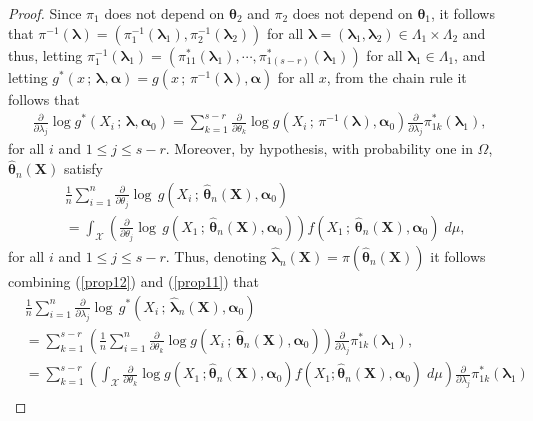\documentclass[10pt,a4paper,onecolumn]{article} %
\newcommand{\bs}{\boldsymbol}
\begin{document}
\begin{proof}Since $\pi_1$ does not depend on $\bs{\theta}_2$ and $\pi_2$ does not depend on $\bs{\theta}_1$, it follows that $\pi^{-1}(\bs{\lambda})=\left(\pi_1^{-1}(\bs{\lambda}_1),\pi_2^{-1}(\bs{\lambda}_2)\right)$ for all $\bs{\lambda}=(\bs{\lambda}_1,\bs{\lambda}_2)\in \Lambda_1\times \Lambda_2$ and thus, letting $\pi_1^{-1}(\bs{\lambda}_1)=\left(\pi^*_{11}(\bs{\lambda}_1),\cdots,\pi^*_{1(s-r)}(\bs{\lambda}_1)\right)$ for all $\bs{\lambda}_1\in \Lambda_1$, and letting $g^*(x\,;\, \bs{\lambda},\bs{\alpha})=g(x\,;\, \pi^{-1}(\bs{\lambda}),\bs{\alpha})$ for all $x$, from the chain rule it follows that
\begin{equation}\label{prop12}
\begin{aligned}
\frac{\partial}{\partial \lambda_j} \log g^*(X_i\,;\,\bs{\lambda},\bs{\alpha}_0)=
\sum_{k=1}^{s-r}\frac{\partial}{\partial \theta_k} \log g(X_i\,;\,\pi^{-1}\left(\bs{\lambda}\right),\bs{\alpha}_0)\frac{\partial}{\partial \lambda_j} \pi^*_{1k}(\bs{\lambda}_1),
\end{aligned}
\end{equation}
for all $i$ and $1\leq j\leq s-r$. Moreover, by hypothesis, with probability one in $\Omega$, $\bs{\hat{\theta}}_n(\bs{X})$ satisfy
\begin{equation}\label{prop11}
\begin{aligned}
&\frac{1}{n}\sum_{i=1}^n \frac{\partial}{\partial \theta_j}  \log\, g(X_i\,;\,\bs{\hat{\theta}}_n(\bs{X}),\bs{\alpha}_0) \\ &= \int_{\mathcal{X}}\left(\frac{\partial}{\partial \theta_j}  \log\, g(X_1\,;\,\bs{\hat{\theta}}_n(\bs{X}),\bs{\alpha}_0)\right)f(X_1\,;\,\bs{\hat{\theta}}_n(\bs{X}),\bs{\alpha}_0)\; d\mu,
\end{aligned}
\end{equation}
for all $i$ and $1\leq j\leq s-r$. Thus, denoting $\bs{\hat{\lambda}}_n(\bs{X})=\pi(\bs{\hat{\theta}}_n(\bs{X}))$ it follows combining
(\ref{prop12}) and (\ref{prop11}) that
\begin{equation*}
\begin{aligned}
&\frac{1}{n}\sum_{i=1}^n \frac{\partial}{\partial \lambda_j}  \log\, g^*(X_i\,;\,\bs{\hat{\lambda}}_n(\bs{X}),\bs{\alpha}_0) \\ & =\sum_{k=1}^{s-r}\left(\frac{1}{n}\sum_{i=1}^n\frac{\partial}{\partial \theta_k} \log g(X_i\,;\,\bs{\hat{\theta}}_n(\bs{X}),\bs{\alpha}_0)\right)\frac{\partial}{\partial \lambda_j} \pi^*_{1k}(\bs{\lambda}_1),\\ &
=\sum_{k=1}^{s-r} \left(\int_{\mathcal{X}}\frac{\partial}{\partial \theta_k}\log g(X_1\,;\bs{\hat{\theta}}_n(\bs{X}),\bs{\alpha}_0)f(X_1;\bs{\hat{\theta}}_n(\bs{X}),\bs{\alpha}_0)\; d\mu\right)\frac{\partial}{\partial \lambda_j} \pi^*_{1k}(\bs{\lambda}_1) \\ &

\end{aligned}
\end{equation*}
\end{proof}
\end{document}
